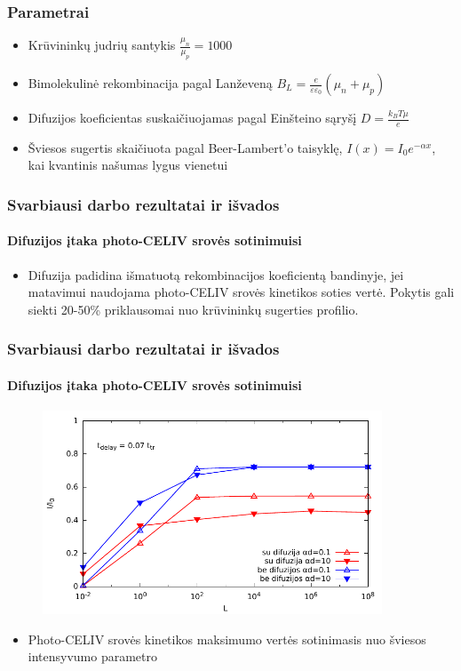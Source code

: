 \documentclass{beamer}
\begin{document}
  
  \begin{frame}
    \frametitle{Parametrai}
    \begin{itemize}
	\item Krūvininkų judrių santykis \(\frac{\mu_n}{\mu_p} = 1000\)
	\item Bimolekulinė rekombinacija pagal Lanževeną \(B_L=\frac{e}{\varepsilon \varepsilon_0}(\mu_n+\mu_p)\)
	\item Difuzijos koeficientas suskaičiuojamas pagal Einšteino sąryšį \(D=\frac{k_B T \mu }{e}\)
	\item Šviesos sugertis skaičiuota pagal Beer-Lambert’o taisyklę, \(I(x)=I_0 e^{-\alpha x}\), kai kvantinis našumas lygus vienetui	
	\end{itemize}
  \end{frame}

  \begin{frame}
    \frametitle{Svarbiausi darbo rezultatai ir išvados}
    \framesubtitle{Difuzijos įtaka photo-CELIV srovės sotinimuisi}
    \begin{itemize}
		\item Difuzija padidina išmatuotą rekombinacijos koeficientą bandinyje, jei matavimui naudojama photo-CELIV srovės kinetikos soties vertė. Pokytis gali siekti 20-50\% priklausomai nuo krūvininkų sugerties profilio.
    \end{itemize}
  \end{frame}

  \begin{frame}
    \frametitle{Svarbiausi darbo rezultatai ir išvados}
    \framesubtitle{Difuzijos įtaka photo-CELIV srovės sotinimuisi}
    \begin{figure}
    	\includegraphics[width=0.9\textwidth]{./media/pdf/semilogsaturation.pdf}
    \end{figure}
    \begin{itemize}
    \item Photo-CELIV srovės kinetikos maksimumo vertės sotinimasis nuo šviesos intensyvumo parametro
    \end{itemize}
  \end{frame}
  
\end{document}
